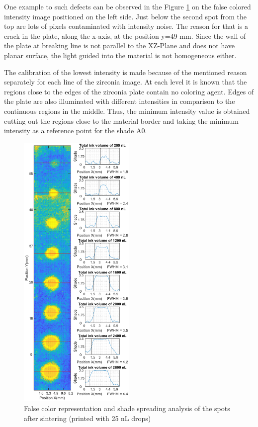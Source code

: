 One example to such defects can be observed in the Figure \ref{fig:drops25} on the false colored intensity image positioned on the left side. Just below the second spot from the top are lots of pixels contaminated with intensity noise. The reason for that is a crack in the plate, along the x-axis, at the position y=49 mm. Since the wall of the plate at breaking line is not parallel to the XZ-Plane and does not have planar surface, the light guided into the material is not homogeneous either. 

The calibration of the lowest intensity is made because of the mentioned reason separately for each line of the zirconia image. At each level it is known that the regions close to the edges of the zirconia plate contain no coloring agent. Edges of the plate are also illuminated with different intensities in comparison to the continuous regions in the middle. Thus, the minimum intensity value is obtained cutting out the regions close to the material border and taking  the minimum intensity as a reference point for the shade A0.
\bigskip

\begin{figure}[H]
	\centering
	\includegraphics[width=0.5\textwidth]{grafiken/drops25.eps}
	\caption{False color representation and shade spreading analysis of the spots after sintering (printed with 25 nL drops)}
	\label{fig:drops25}
\end{figure} 

